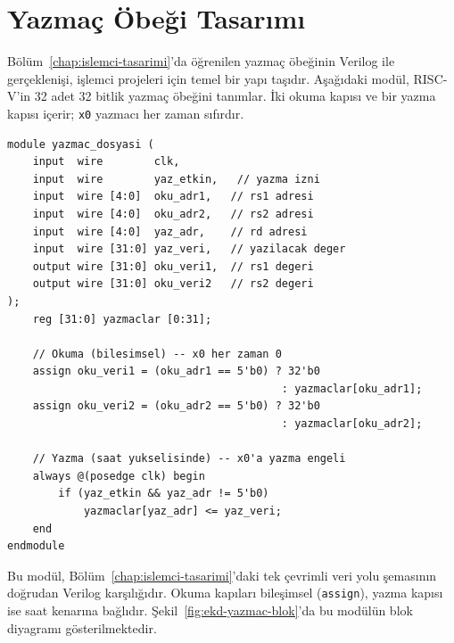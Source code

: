 \section{Yazmaç Öbeği Tasarımı}
\label{sec:ekd-yazmac-dosyasi}

Bölüm~\ref{chap:islemci-tasarimi}'da öğrenilen yazmaç öbeğinin Verilog ile gerçeklenişi, işlemci projeleri için temel bir yapı taşıdır. Aşağıdaki modül, RISC-V'in 32 adet 32 bitlik yazmaç öbeğini tanımlar. İki okuma kapısı ve bir yazma kapısı içerir; \texttt{x0} yazmacı her zaman sıfırdır.

\begin{lstlisting}[style=verilog, caption={RISC-V yazmaç öbeği (32$\times$32)}, label={lst:ekd-yazmac}]
module yazmac_dosyasi (
    input  wire        clk,
    input  wire        yaz_etkin,   // yazma izni
    input  wire [4:0]  oku_adr1,   // rs1 adresi
    input  wire [4:0]  oku_adr2,   // rs2 adresi
    input  wire [4:0]  yaz_adr,    // rd adresi
    input  wire [31:0] yaz_veri,   // yazilacak deger
    output wire [31:0] oku_veri1,  // rs1 degeri
    output wire [31:0] oku_veri2   // rs2 degeri
);
    reg [31:0] yazmaclar [0:31];

    // Okuma (bilesimsel) -- x0 her zaman 0
    assign oku_veri1 = (oku_adr1 == 5'b0) ? 32'b0
                                           : yazmaclar[oku_adr1];
    assign oku_veri2 = (oku_adr2 == 5'b0) ? 32'b0
                                           : yazmaclar[oku_adr2];

    // Yazma (saat yukselisinde) -- x0'a yazma engeli
    always @(posedge clk) begin
        if (yaz_etkin && yaz_adr != 5'b0)
            yazmaclar[yaz_adr] <= yaz_veri;
    end
endmodule
\end{lstlisting}

Bu modül, Bölüm~\ref{chap:islemci-tasarimi}'daki tek çevrimli veri yolu şemasının doğrudan Verilog karşılığıdır. Okuma kapıları bileşimsel (\texttt{assign}), yazma kapısı ise saat kenarına bağlıdır. Şekil~\ref{fig:ekd-yazmac-blok}'da bu modülün blok diyagramı gösterilmektedir.

